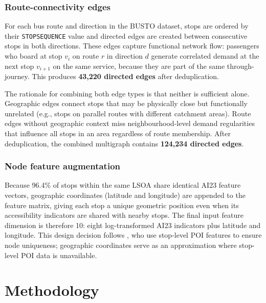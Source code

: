 \documentclass[12pt,a4paper]{report}
\begin{document}
\subsection{Route-connectivity edges}
For each bus route and direction in the BUSTO dataset, stops are ordered by
their \texttt{STOPSEQUENCE} value and directed edges are created between
consecutive stops in both directions. These edges capture functional
network flow: passengers who board at stop $v_i$ on route $r$ in direction $d$
generate correlated demand at the next stop $v_{i+1}$ on the same service,
because they are part of the same through-journey. This produces
\textbf{43,220 directed edges} after deduplication.

The rationale for combining both edge types is that neither is sufficient alone.
Geographic edges connect stops that may be physically close but functionally
unrelated (e.g., stops on parallel routes with different catchment areas).
Route edges without geographic context miss neighbourhood-level demand
regularities that influence all stops in an area regardless of route membership.
After deduplication, the combined multigraph contains
\textbf{124,234 directed edges}.

\subsection{Node feature augmentation}
Because 96.4\% of stops within the same LSOA share identical AI23 feature
vectors, geographic coordinates (latitude and longitude) are appended to the
feature matrix, giving each stop a unique geometric position even when its
accessibility indicators are shared with nearby stops. The final input feature
dimension is therefore 10: eight log-transformed AI23 indicators plus latitude
and longitude. This design decision follows \citet{zheng2025mfstgat}, who use
stop-level POI features to ensure node uniqueness; geographic coordinates serve
as an approximation where stop-level POI data is unavailable.


\chapter{Methodology}
\label{ch:method}
\end{document}
